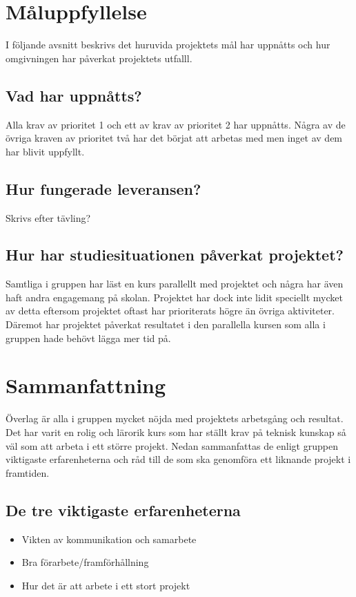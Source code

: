 \documentclass[11pt]{article}
\begin{document}
\pagebreak

\section{Måluppfyllelse}
I följande avsnitt beskrivs det huruvida projektets mål har uppnåtts och hur omgivningen har påverkat projektets utfalll.

\subsection{Vad har uppnåtts?}
Alla krav av prioritet 1 och ett av krav av prioritet 2 har uppnåtts. Några av de övriga kraven av prioritet två har det börjat att arbetas med men inget av dem har blivit uppfyllt.

\subsection{Hur fungerade leveransen?}
Skrivs efter tävling?

\subsection{Hur har studiesituationen påverkat projektet?}
Samtliga i gruppen har läst en kurs parallellt med projektet och några har även haft andra engagemang på skolan. Projektet har dock inte lidit speciellt mycket av detta eftersom projektet oftast har prioriterats högre än övriga aktiviteter. Däremot har projektet påverkat resultatet i den parallella kursen som alla i gruppen hade behövt lägga mer tid på. 

 \pagebreak 

\section{Sammanfattning}
Överlag är alla i gruppen mycket nöjda med projektets arbetsgång och resultat. Det har varit en rolig och lärorik kurs som har ställt krav på teknisk kunskap så väl som att arbeta i ett större projekt. Nedan sammanfattas de enligt gruppen viktigaste erfarenheterna och råd till de som ska genomföra ett liknande projekt i framtiden.

\subsection{De tre viktigaste erfarenheterna}
\begin{itemize}
\item Vikten av kommunikation och samarbete
\item Bra förarbete/framförhållning
\item Hur det är att arbete i ett stort projekt
\end{itemize} 
\end{document}

